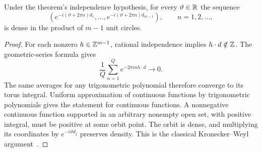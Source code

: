 \begin{lemma}
Under the theorem's independence hypothesis, for every $\vartheta\in\mathbb R$
the sequence
\[
 \left(e^{-i(\vartheta+2\pi n)d_1},\ldots,
 e^{-i(\vartheta+2\pi n)d_{m-1}}\right),\qquad n=1,2,\ldots,
\]
is dense in the product of $m-1$ unit circles.
\end{lemma}
\begin{proof}
For each nonzero $h\in\mathbb Z^{m-1}$, rational independence implies
$h\cdot d\notin\mathbb Z$. The geometric-series formula gives
\[
 \frac1Q\sum_{n=1}^Q e^{-2\pi i n h\cdot d}\longrightarrow0.
\]
The same averages for any trigonometric polynomial therefore converge
to its torus integral. Uniform approximation of continuous functions
by trigonometric polynomials gives the statement for continuous
functions. A nonnegative continuous function supported in an arbitrary
nonempty open set, with positive integral, must be positive at some
orbit point. The orbit is dense, and multiplying its coordinates by
$e^{-i\vartheta d_j}$ preserves density. This is the classical
Kronecker--Weyl argument~\cite{taoequidistribution}.
\end{proof}

